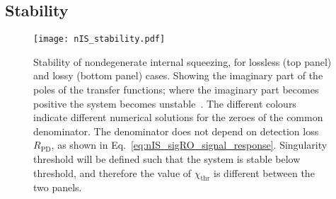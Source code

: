 \subsection{Stability}
\label{sec:nIS_stability}

\begin{figure}
    \centering
    \texttt{[image: nIS\_stability.pdf]}
    \caption{  Stability of nondegenerate internal squeezing, for lossless (top panel) and lossy (bottom panel) cases. Showing the imaginary part of the poles of the transfer functions; where the imaginary part becomes positive the system becomes unstable~\cite{}. The different colours indicate different numerical solutions for the zeroes of the common denominator. The denominator does not depend on detection loss $R_\text{PD}$, as shown in Eq.~\ref{eq:nIS_sigRO_signal_response}. Singularity threshold will be defined such that the system is stable below threshold, and therefore the value of $\chi_\text{thr}$ is different between the two panels.}
    \label{fig:nIS_stability}
\end{figure}

